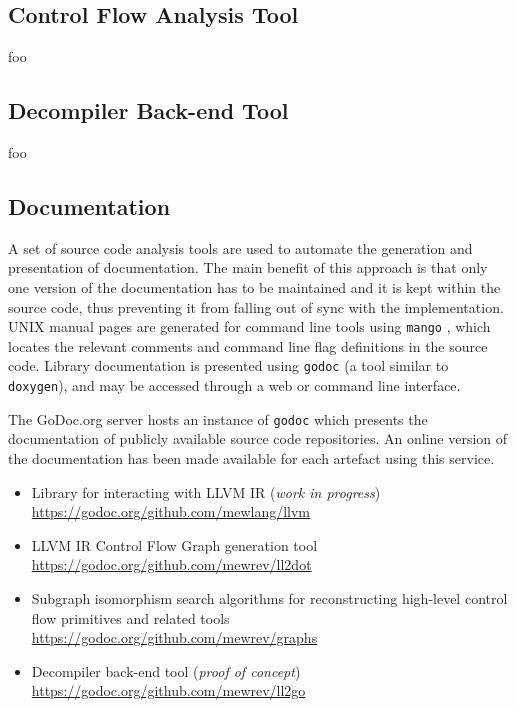 \subsection{Control Flow Analysis Tool}

foo


\subsection{Decompiler Back-end Tool}

foo


\subsection{Documentation}


A set of source code analysis tools are used to automate the generation and presentation of documentation. The main benefit of this approach is that only one version of the documentation has to be maintained and it is kept within the source code, thus preventing it from falling out of sync with the implementation. UNIX manual pages are generated for command line tools using \texttt{mango} \cite{mango}, which locates the relevant comments and command line flag definitions in the source code. Library documentation is presented using \texttt{godoc} \cite{godoc} (a tool similar to \texttt{doxygen}), and may be accessed through a web or command line interface.

The GoDoc.org server hosts an instance of \texttt{godoc} which presents the documentation of publicly available source code repositories. An online version of the documentation has been made available for each artefact using this service.

\begin{itemize}
	\item Library for interacting with LLVM IR (\textit{work in progress}) \\ \url{https://godoc.org/github.com/mewlang/llvm}
	\item LLVM IR Control Flow Graph generation tool \\ \url{https://godoc.org/github.com/mewrev/ll2dot}
	\item Subgraph isomorphism search algorithms for reconstructing high-level control flow primitives and related tools \\ \url{https://godoc.org/github.com/mewrev/graphs}
	\item Decompiler back-end tool (\textit{proof of concept}) \\ \url{https://godoc.org/github.com/mewrev/ll2go}
\end{itemize}
